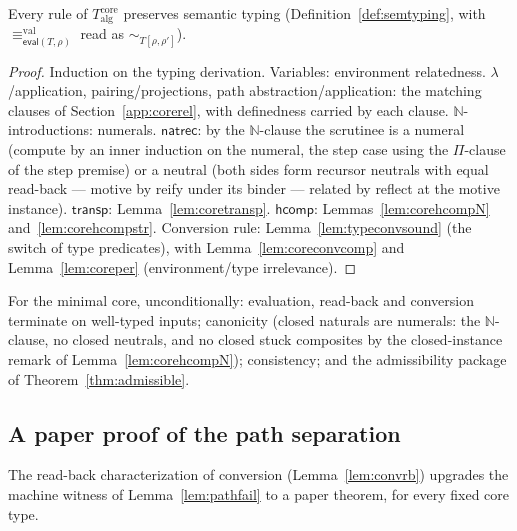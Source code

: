 \documentclass{lmcs}
\newcommand{\transp}{\mathsf{transp}}
\newcommand{\hcomp}{\mathsf{hcomp}}
\newcommand{\valeq}{\equiv^{\mathrm{val}}}
\newcommand{\evalop}{\mathsf{eval}}
\begin{document}
\begin{thm}\label{thm:corefund}
  Every rule of $T^{\mathrm{core}}_{\mathrm{alg}}$ preserves
  semantic typing (Definition~\ref{def:semtyping}, with
  $\valeq_{\evalop(T,\rho)}$ read as $\sim_{T[\rho,\rho']}$).
\end{thm}
\begin{proof}
  Induction on the typing derivation.  Variables: environment
  relatedness.  $\lambda$/application, pairing/projections, path
  abstraction/application: the matching clauses of
  Section~\ref{app:corerel}, with definedness carried by each
  clause.  $\mathbb{N}$-introductions: numerals.
  $\mathsf{natrec}$: by the $\mathbb{N}$-clause the scrutinee is a
  numeral (compute by an inner induction on the numeral, the step
  case using the $\Pi$-clause of the step premise) or a neutral
  (both sides form recursor neutrals with equal read-back ---
  motive by reify under its binder ---
  related by reflect at the motive instance).  $\transp$:
  Lemma~\ref{lem:coretransp}.  $\hcomp$:
  Lemmas~\ref{lem:corehcompN} and~\ref{lem:corehcompstr}.
  Conversion rule: Lemma~\ref{lem:typeconvsound} (the switch of
  type predicates), with Lemma~\ref{lem:coreconvcomp} and
  Lemma~\ref{lem:coreper} (environment/type irrelevance).
\end{proof}

\begin{cor}\label{cor:corepkg}
  For the minimal core, unconditionally: evaluation, read-back and
  conversion terminate on well-typed inputs; canonicity (closed
  naturals are numerals: the $\mathbb{N}$-clause, no closed
  neutrals, and no closed stuck composites by the closed-instance
  remark of Lemma~\ref{lem:corehcompN}); consistency; and the
  admissibility package of Theorem~\ref{thm:admissible}.
\end{cor}

\subsection{A paper proof of the path separation}
\label{app:papersep}

The read-back characterization of conversion
(Lemma~\ref{lem:convrb}) upgrades the machine witness of
Lemma~\ref{lem:pathfail} to a paper theorem, for every fixed core
type.
\end{document}
